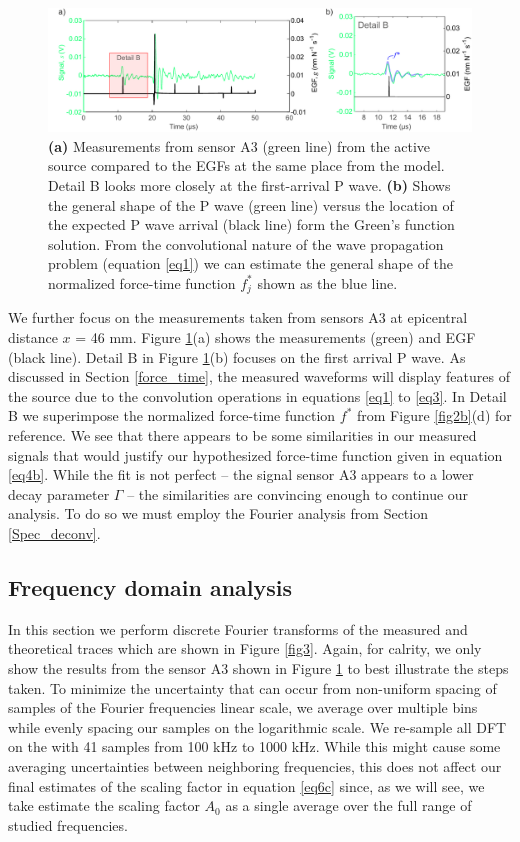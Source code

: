 \documentclass[preprint,3p, 11pt,authoryear]{elsarticle}
\begin{document}
\begin{figure}[ht]
     	\centering
\includegraphics[scale= 0.85]{FIG5.pdf} 
\caption{\textbf{(a)} Measurements from sensor A3 (green line) from the active source compared to the EGFs at the same place from the model.  Detail B looks more closely at the first-arrival P wave. \textbf{(b)} Shows the general shape of the P wave (green line) versus the location of the expected P wave arrival (black line) form the Green's function solution.  From the convolutional nature of the wave propagation problem (equation \eqref{eq1}) we can estimate the general shape of the normalized force-time function $f^{*}_{j}$ shown as the blue line.}
	\label{fig5} 
\end{figure}

We further focus on the measurements taken from sensors A3 at epicentral distance $x$ = 46 mm. Figure \ref{fig5}(a) shows the measurements (green) and EGF (black line).  Detail B in Figure \ref{fig5}(b) focuses on the first arrival P wave. As discussed in Section \ref{force_time}, the measured waveforms will display features of the source due to the convolution operations in equations \eqref{eq1} to \eqref{eq3}. In Detail B we superimpose the normalized force-time function $f^{*}$ from Figure \ref{fig2b}(d) for reference. We see that there appears to be some similarities in our measured signals that would justify our hypothesized force-time function given in equation \eqref{eq4b}.  While the fit is not perfect -- the signal sensor A3 appears to a lower decay parameter $\Gamma$ -- the similarities are convincing enough to continue our analysis. To do so we must employ the Fourier analysis from Section \ref{Spec_deconv}.

\subsection{Frequency domain analysis}
In this section we perform discrete Fourier transforms of the measured and theoretical traces which are shown in Figure \ref{fig3}.  Again, for calrity, we only show the results from the sensor A3 shown in Figure \ref{fig5} to best illustrate the steps taken. To minimize the uncertainty that can occur from non-uniform spacing of samples of the Fourier frequencies linear scale, we average over multiple bins while evenly spacing our samples on the logarithmic scale.  We re-sample all DFT on the with 41 samples from 100 kHz to 1000 kHz.  While this might cause some averaging uncertainties between neighboring frequencies, this does not affect our final estimates of the scaling factor in equation \eqref{eq6c} since, as we will see, we take estimate the scaling factor $A_{0}$ as a single average over the full range of studied frequencies. 
\end{document}
